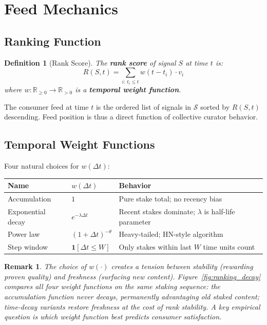 \documentclass[12pt]{article}
\newtheorem{definition}{Definition}
\newtheorem{remark}{Remark}
\begin{document}
\section{Feed Mechanics}

\subsection{Ranking Function}

\begin{definition}[Rank Score]
The \textbf{rank score} of signal $S$ at time $t$ is:
\[
  R(S, t) = \sum_{i:\, t_i \leq t} w(t - t_i) \cdot v_i
\]
where $w : \mathbb{R}_{\geq 0} \to \mathbb{R}_{> 0}$ is a \textbf{temporal weight function}.
\end{definition}

The consumer feed at time $t$ is the ordered list of signals in $\mathcal{S}$ sorted by $R(S, t)$ descending. Feed position is thus a direct function of collective curator behavior.

\subsection{Temporal Weight Functions}

Four natural choices for $w(\Delta t)$:

\begin{center}
\begin{tabular}{l l l}
\toprule
Name & $w(\Delta t)$ & Behavior \\
\midrule
Accumulation & $1$ & Pure stake total; no recency bias \\
Exponential decay & $e^{-\lambda \Delta t}$ & Recent stakes dominate; $\lambda$ is half-life parameter \\
Power law & $(1 + \Delta t)^{-\theta}$ & Heavy-tailed; HN-style algorithm \\
Step window & $\mathbf{1}[\Delta t \leq W]$ & Only stakes within last $W$ time units count \\
\bottomrule
\end{tabular}
\end{center}

\begin{remark}
The choice of $w(\cdot)$ creates a tension between \emph{stability} (rewarding proven quality) and \emph{freshness} (surfacing new content). Figure~\ref{fig:ranking_decay} compares all four weight functions on the same staking sequence: the accumulation function never decays, permanently advantaging old staked content; time-decay variants restore freshness at the cost of rank stability. A key empirical question is which weight function best predicts consumer satisfaction.
\end{remark}
\end{document}
